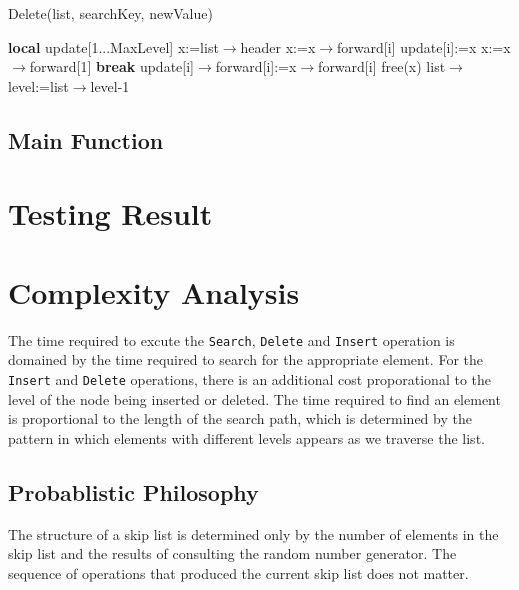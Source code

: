 \documentclass[10pt,english, openany]{book}
\begin{document}
\begin{algorithm}
\caption{Delete(list, searchKey, newValue)}	
\begin{algorithmic}[1]
	 \Require
	 \Ensure
	 \State \textbf{local} update[1...MaxLevel]
	 \State x:=list$\rightarrow$header
	 \State x:=x$\rightarrow$forward[i]
	 \EndWhile
	 \State update[i]:=x
	 \EndFor
	 \State x:=x$\rightarrow$forward[1]
	 \State \textbf{break}
	 \EndIf
	 \State update[i]$\rightarrow$forward[i]:=x$\rightarrow$forward[i]
	 \EndFor
	 \State free(x)
	 \State list$\rightarrow$level:=list$\rightarrow$level-1
	 \EndWhile
	 \EndIf
\end{algorithmic}
\end{algorithm}

\section{Main Function}



\chapter{Testing Result}
\chapter{Complexity Analysis}
The time required to excute the \texttt{Search}, \texttt{Delete} and \texttt{Insert} operation is domained by the time required to search for the appropriate element. For the \texttt{Insert} and \texttt{Delete} operations, there is an additional cost proporational to the level of the node being inserted or deleted. The time required to find an element is proportional to the length of the search path, which is determined by the pattern in which elements with different levels appears as we traverse the list.
\section{Probablistic Philosophy}
The structure of a skip list is determined only by the number of elements in the skip list and the results of consulting the random number generator. The sequence of operations that produced the current skip list does not matter. 
\end{document}
